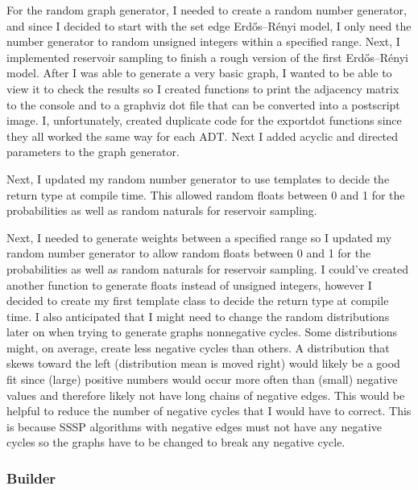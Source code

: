 \documentclass{article}
\begin{document}
For the random graph generator, I needed to create a random number generator, and since I decided to start with the set edge Erdős–Rényi model, I only need the number generator to random unsigned integers within a specified range. Next, I implemented reservoir sampling to finish a rough version of the first Erdős–Rényi model. After I was able to generate a very basic graph, I wanted to be able to view it to check the results so I created functions to print the adjacency matrix to the console and to a graphviz dot file that can be converted into a postscript image. I, unfortunately, created duplicate code for the exportdot functions since they all worked the same way for each ADT. Next I added acyclic and directed parameters to the graph generator.

Next, I updated my random number generator to use templates to decide the return type at compile time. This allowed random floats between 0 and 1 for the probabilities as well as random naturals for reservoir sampling.

Next, I needed to generate weights between a specified range so I updated my random number generator to allow random floats between 0 and 1 for the probabilities as well as random naturals for reservoir sampling. I could've created another function to generate floats instead of unsigned integers, however I decided to create my first template class to decide the return type at compile time. I also anticipated that I might need to change the random distributions later on when trying to generate graphs nonnegative cycles. Some distributions might, on average, create less negative cycles than others. A distribution that skews toward the left (distribution mean is moved right) would likely be a good fit since (large) positive numbers would occur more often than (small) negative values and therefore likely not have long chains of negative edges. This would be helpful to reduce the number of negative cycles that I would have to correct. This is because SSSP algorithms with negative edges must not have any negative cycles so the graphs have to be changed to break any negative cycle.

\subsubsection{Builder}
\end{document}
